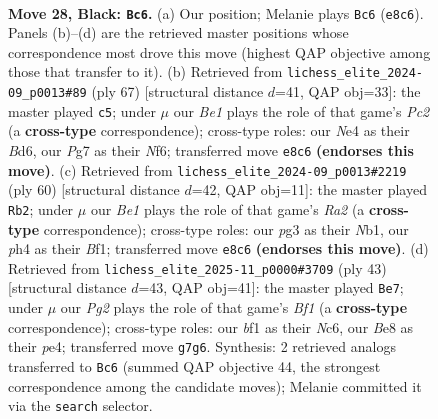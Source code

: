 \documentclass[11pt]{article}
\begin{document}
\clearpage

\begin{figure}[p]\centering
\begin{subfigure}{0.46\textwidth}\centering
\resizebox{\linewidth}{!}{%
\newchessgame
\chessboard[
  setfen={4b1k1/R4pp1/4p3/1p5p/1P1PnP1P/2r3P1/1N2P3/5BK1 b - - 0 28},
  showmover=false,
  pgfstyle=straightmove, color=movearrow, markmove={e8-c6}
]}
\caption{}
\end{subfigure}\hfill
\begin{subfigure}{0.46\textwidth}\centering
\resizebox{\linewidth}{!}{%
\newchessgame
\chessboard[
  setfen={4r3/1pp3k1/p2b1np1/5p2/3P1P2/2N1PB2/PP3K2/7R b - - 3 34},
  showmover=false,
  pgfstyle=straightmove, color=movearrow, markmove={c7-c5}
]}
\caption{}
\end{subfigure}
\\[4pt]
\begin{subfigure}{0.46\textwidth}\centering
\resizebox{\linewidth}{!}{%
\newchessgame
\chessboard[
  setfen={3kb3/p6p/4p2p/3pP3/2pP4/1rP5/R4PP1/1NK2B1R w - - 3 31},
  showmover=false,
  pgfstyle=straightmove, color=movearrow, markmove={a2-b2}
]}
\caption{}
\end{subfigure}\hfill
\begin{subfigure}{0.46\textwidth}\centering
\resizebox{\linewidth}{!}{%
\newchessgame
\chessboard[
  setfen={1r2kb2/5p1p/p1npp3/2p5/N1P1PP2/1P2B2P/P2K4/7R b - - 0 22},
  showmover=false,
  pgfstyle=straightmove, color=movearrow, markmove={f8-e7}
]}
\caption{}
\end{subfigure}
\caption{\textbf{Move 28, Black: \texttt{Bc6}.} (a) Our position; Melanie plays \texttt{Bc6} (\texttt{e8c6}). Panels (b)--(d) are the retrieved master positions whose correspondence most drove this move (highest QAP objective among those that transfer to it). (b) Retrieved from \texttt{lichess\_elite\_2024-09\_p0013\#89} (ply 67) [structural distance $d$=41, QAP obj=33]: the master played \texttt{c5}; under $\mu$ our \emph{Be1} plays the role of that game's \emph{Pc2} (a \textbf{cross-type} correspondence); cross-type roles: our \emph{N}e4 as their \emph{B}d6, our \emph{P}g7 as their \emph{N}f6; transferred move \texttt{e8c6} \textbf{(endorses this move)}. (c) Retrieved from \texttt{lichess\_elite\_2024-09\_p0013\#2219} (ply 60) [structural distance $d$=42, QAP obj=11]: the master played \texttt{Rb2}; under $\mu$ our \emph{Be1} plays the role of that game's \emph{Ra2} (a \textbf{cross-type} correspondence); cross-type roles: our \emph{p}g3 as their \emph{N}b1, our \emph{p}h4 as their \emph{B}f1; transferred move \texttt{e8c6} \textbf{(endorses this move)}. (d) Retrieved from \texttt{lichess\_elite\_2025-11\_p0000\#3709} (ply 43) [structural distance $d$=43, QAP obj=41]: the master played \texttt{Be7}; under $\mu$ our \emph{Pg2} plays the role of that game's \emph{Bf1} (a \textbf{cross-type} correspondence); cross-type roles: our \emph{b}f1 as their \emph{N}c6, our \emph{B}e8 as their \emph{p}e4; transferred move \texttt{g7g6}. Synthesis: 2 retrieved analogs transferred to \texttt{Bc6} (summed QAP objective 44, the strongest correspondence among the candidate moves); Melanie committed it via the \texttt{search} selector.}
\label{fig:thought-m55}
\end{figure}
\end{document}
